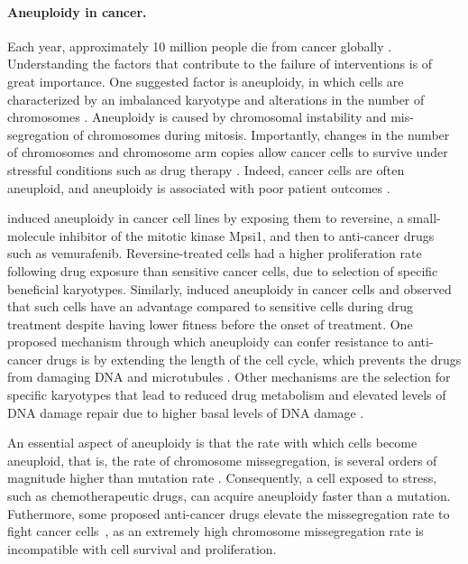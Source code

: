 \documentclass[12pt]{extarticle}
\begin{document}
\paragraph{Aneuploidy in cancer.}  
Each year, approximately 10 million people die from cancer globally \citep{kocarnik2022cancer}. Understanding the factors that contribute to the failure of interventions is of great importance. %
One suggested factor is aneuploidy, in which cells are characterized by an imbalanced karyotype and alterations in the number of chromosomes \citep{schukken2018cin}. 
Aneuploidy is caused by chromosomal instability and mis-segregation of chromosomes during mitosis. Importantly, changes in the number of chromosomes and chromosome arm copies allow cancer cells to survive under stressful conditions such as drug therapy \citep{lukow2021chromosomal,rutledge2016selective,ippolito2021gene}. %
Indeed, cancer cells are often aneuploid, and aneuploidy is associated with poor patient outcomes \citep{ben2020context,smith2018systematic}. 

 \citet{ippolito2021gene} induced aneuploidy in cancer cell lines by exposing them to reversine, a small-molecule inhibitor of the mitotic kinase Mpsi1, and then to anti-cancer drugs such as vemurafenib. Reversine-treated cells had a higher proliferation rate following drug exposure than sensitive cancer cells, due to selection of specific beneficial karyotypes.
Similarly, \citet{lukow2021chromosomal} induced aneuploidy in cancer cells and observed that such cells have an advantage compared to sensitive cells during drug treatment despite having lower fitness before the onset of treatment.
One proposed mechanism through which aneuploidy can confer resistance to anti-cancer drugs is by extending the length of the cell cycle, which prevents the drugs from damaging DNA and microtubules \citep{replogle2020aneuploidy}. Other mechanisms are the selection for specific karyotypes that lead to reduced drug metabolism \citep{ippolito2021gene} and elevated levels of DNA damage repair due to higher basal levels of DNA damage \citep{zerbib2023human}. %
 
An essential aspect of aneuploidy is that the rate with which cells become aneuploid, that is, the rate of chromosome missegregation, is several orders of magnitude higher than mutation rate \citep{bakker2023predicting}. Consequently, a cell exposed to stress, such as chemotherapeutic drugs, can acquire aneuploidy faster than a mutation.
Futhermore, some proposed anti-cancer drugs elevate the missegregation rate to fight cancer cells~\citep{lee2016effects}, as an extremely high chromosome missegregation rate is incompatible with cell survival and proliferation. %
\end{document}
